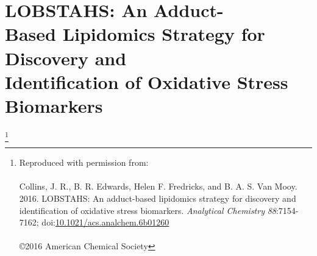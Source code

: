 
\begingroup%
\makeatletter%
\cleardoublepage%
\let\newpage\relax%
\let\clearpage\relax%
\vspace*{\fill}%
\vspace*{\dimexpr-50\p@-\baselineskip}%
\chapter[LOBSTAHS: An Adduct-Based Lipidomics Strategy for Discovery and Identification of Oxidative Stress Biomarkers]{LOBSTAHS: An Adduct-\\Based Lipidomics Strategy for Discovery and \\Identification of Oxidative Stress Biomarkers}
\label{chap3}
\let\thefootnote\relax\footnote{{\setlength{\parindent}{0pt}Reproduced with permission from:\\\\Collins, J. R., B. R. Edwards, Helen F. Fredricks, and B. A. S. Van Mooy. 2016. LOBSTAHS: An adduct-based lipidomics strategy for discovery and identification of oxidative stress biomarkers. \emph{Analytical Chemistry} \emph{88}:7154-7162; doi:\href{http://dx.doi.org/10.1021/acs.analchem.6b01260}{10.1021/acs.analchem.6b01260}\\\\\copyright 2016 American Chemical Society}}
\vspace*{\fill}%
\endgroup%

\clearpage
